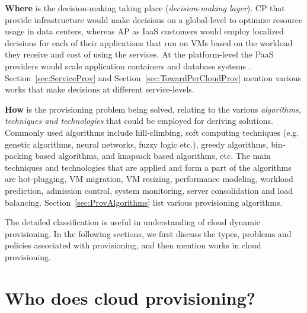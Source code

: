 \documentclass[10pt,journal,cspaper,compsoc]{IEEEtran}
\begin{document}
\begin{IEEEitemize}
\item \textbf{Where} is the decision-making taking place (\textit{decision-making layer}). CP that provide infrastructure would make decisions on a global-level to optimize resource usage in data centers, whereas AP as IaaS customers would employ localized decisions for each of their applications that run on VMs based on the workload they receive and cost of using the services. At the platform-level the PaaS providers would scale application containers and database systems \cite{2011_DynamicallyScalingApps}. Section~\ref{sec:ServiceProv} and Section~\ref{sec:TowardPerCloudProv} mention various works that make decisions at different service-levels.
\item \textbf{How} is the provisioning problem being solved, relating to the various \textit{algorithms, techniques and technologies} that could be employed for deriving solutions. Commonly used algorithms include hill-climbing, soft computing techniques (e.g. genetic algorithms, neural networks, fuzzy logic etc.), greedy algorithms, bin-packing based algorithms, and knapsack based algorithms, etc. The main techniques and technologies that are applied and form a part of the algorithms are hot-plugging, VM migration, VM resizing, performance modeling, workload prediction, admission control, system monitoring, server consolidation and load balancing. Section~\ref{sec:ProvAlgorithms} list various provisioning algorithms.
\end{IEEEitemize}

The detailed classification is useful in understanding of cloud dynamic provisioning. In the following sections, we first discuss the types, problems and policies associated with provisioning, and then mention works in cloud provisioning.

\section{Who does cloud provisioning?}
\label{sec:TypesCloudProvTerm}
\end{document}
